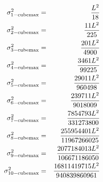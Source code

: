 \begin{eqnarray}
 \sigma^2_{\rm 1-cube max}  & = & \frac{L^2}{18}\nonumber\\
 \sigma^2_{\rm 2-cube max}  & = & \frac{11L^2}{225} \nonumber\\
 \sigma^2_{\rm 3-cube max }  & = &  \frac{201L^2}{4900}\nonumber\\
 \sigma^2_{\rm 4-cube max }  & = & \frac{3461 L^2}{99225}\nonumber\\
 \sigma^2_{\rm 5-cube max}  & = &  \frac{29011 L^2}{960498}\nonumber\\
 \sigma^2_{\rm 6-cube max}  & = & \frac{239711 L^2}{9018009} \nonumber\\
 \sigma^2_{\rm 7-cube max}  & = &  \frac{7854793 L^2}{331273800}\nonumber\\
 \sigma^2_{\rm 8-cube max}  & = & \frac{255954401 L^2}{11967266025}\nonumber\\
 \sigma^2_{\rm 9-cube max}  & = & \frac{2077184013 L^2}{106671186050}\nonumber\\
 \sigma^2_{\rm 10-cube max} & = & \frac{16811419715 L^2}{940839860961} \nonumber
\end{eqnarray}

